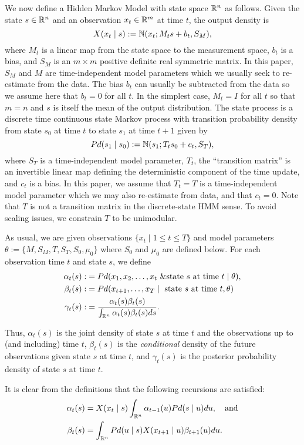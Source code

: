 \documentclass[12pt,leqno]{article}
\begin{document}
We now define a Hidden Markov Model with state space ${\mathbb R}^n$ as follows.  Given the state $s\in{\mathbb R}^n$ and an observation $x_t\in{\mathbb R}^m$ at time $t$, the output density is
$$
X(x_t\mid s) := {\mathbb N}(x_t;M_ts + b_t,S_M),
$$
where $M_t$ is a linear map from the state space to the
measurement space, $b_t$ is a bias, and $S_M$ is an $m\times{m}$ positive definite real symmetric matrix.  In this paper, $S_M$ and $M$ are time-independent model parameters which we usually seek to re-estimate from the data.  The bias $b_t$ can
usually be 
subtracted from the data so we assume here that $b_t = 0$ for all $t$. 
In the simplest case, $M_t = I$ for all $t$ so that $m = n$ and $s$ is itself the mean of the output distribution.  
The state process is a discrete time continuous state Markov process with transition probability density
from state $s_0$ at time $t$ to state $s_1$ at time $t+1$ given by
$$
Pd(s_1\mid s_0) :=  {\mathbb N}(s_1;T_ts_0+c_t,S_T),
$$
where $S_T$ is a time-independent model parameter, $T_t$, the ``transition matrix'' is an invertible linear map  
defining the deterministic component of the time update, and $c_t$ is a bias.  In this paper, we assume that
$T_t = T$ is a time-independent model parameter which we may
also re-estimate from data, and that $c_t = 0$.  Note that $T$ is not a transition matrix in the
discrete-state HMM sense. To avoid scaling issues, we constrain $T$ to be unimodular.

As usual, we are given observations $\{x_t\mid 1\le t\le T\}$ and model parameters $\theta := \{M,S_M,T,S_T,S_0,\mu_0\}$
where $S_0$ and $\mu_0$ are defined below.  For each observation time $t$ and state $s$, we define
\begin{align*}
  \alpha_t(s) :&= Pd(x_1,x_2,\dots,x_t~ \& \text{state $s$ at time $t$}\mid \theta ),\\
  \beta_t(s) :&= Pd(x_{t+1},\dots,x_T \mid ~\text{state $s$ at time $t$},\theta)\\
  \gamma_t(s) :&= \frac{\alpha_t(s)\beta_t(s)}{\int_{{\mathbb R}^n}\alpha_t(s)\beta_t(s)ds}.
\end{align*}

Thus, $\alpha_t(s)$ is the joint density of state $s$ at time $t$ and the observations up to (and including) time $t$,
$\beta_t(s)$ is the {\em conditional} density of the future observations given state $s$ at time $t$, and $\gamma_t(s)$
is the posterior probability density of state $s$ at time $t$.

It is clear from the definitions that the following recursions are satisfied:
\begin{align}
\alpha_t(s) &= X(x_t \mid s)\int_{{\mathbb R}^n}\alpha_{t-1}(u)Pd(s \mid u)du,\quad\text{and}\label{alpha:0}\\
\beta_t(s) &= \int_{{\mathbb R}^{n}}Pd(u \mid s)X(x_{t+1} \mid u)\beta_{t+1}(u)du.\label{beta:0}
\end{align}
\end{document}
